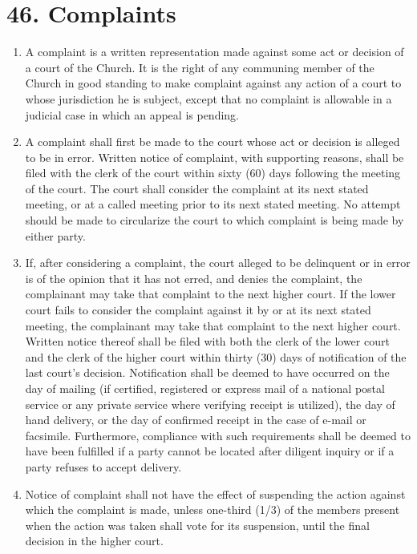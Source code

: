 \documentclass[
]{book}
\providecommand{\tightlist}{%
  \setlength{\itemsep}{0pt}\setlength{\parskip}{0pt}}
\begin{document}
\hypertarget{complaints}{%
\section*{46. Complaints}\label{complaints}}

\protect\hypertarget{chapter-slug-46-complaints}{\href{}{}}

\begin{enumerate}
\def\labelenumi{\arabic{enumi}.}
\tightlist
\item
  \protect\hypertarget{46}{\href{}{}}A complaint is a written representation made against some act or decision of a court of the Church. It is the right of any communing member of the Church in good standing to make complaint against any action of a court to whose jurisdiction he is subject, except that no complaint is allowable in a judicial case in which an appeal is pending.
\item
  A complaint shall first be made to the court whose act or decision is alleged to be in error. Written notice of complaint, with supporting reasons, shall be filed with the clerk of the court within sixty (60) days following the meeting of the court. The court shall consider the complaint at its next stated meeting, or at a called meeting prior to its next stated meeting. No attempt should be made to circularize the court to which complaint is being made by either party.
\item
  If, after considering a complaint, the court alleged to be delinquent or in error is of the opinion that it has not erred, and denies the complaint, the complainant may take that complaint to the next higher court. If the lower court fails to consider the complaint against it by or at its next stated meeting, the complainant may take that complaint to the next higher court. Written notice thereof shall be filed with both the clerk of the lower court and the clerk of the higher court within thirty (30) days of notification of the last court's decision. Notification shall be deemed to have occurred on the day of mailing (if certified, registered or express mail of a national postal service or any private service where verifying receipt is utilized), the day of hand delivery, or the day of confirmed receipt in the case of e-mail or facsimile. Furthermore, compliance with such requirements shall be deemed to have been fulfilled if a party cannot be located after diligent inquiry or if a party refuses to accept delivery.
\item
  Notice of complaint shall not have the effect of suspending the action against which the complaint is made, unless one-third (1/3) of the members present when the action was taken shall vote for its suspension, until the final decision in the higher court.

\end{enumerate}
\end{document}
